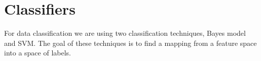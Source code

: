 \chapter{Classifiers}
For data classification we are using two classification techniques, Bayes model and SVM. The goal of these techniques is to find a mapping from a feature space into a space of labels.






